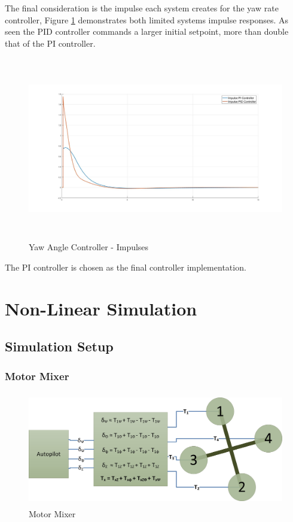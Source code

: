 	The final consideration is the impulse each system creates for the yaw rate controller, Figure \ref{IM_YawAngleImpulse} demonstrates both limited systems impulse responses. As seen the PID controller commands a larger initial setpoint, more than double that of the PI controller.    
	
	\begin{figure}[H]
		\centering
		\includegraphics[height = 8cm]{../Design/Matlab/Controllers/yaw_angle_impulse.jpg}
		\caption{Yaw Angle Controller -  Impulses}
		\label{IM_YawAngleImpulse}
	\end{figure}
	
	The PI controller is chosen as the final controller implementation. 
	
	\section{Non-Linear Simulation}\label{SECT_Nonlinear}
	\subsection{Simulation Setup}
	\subsubsection{Motor Mixer}		
	\begin{figure}[H]
		\centering
		\includegraphics[height = 5cm]{../References/Diagrams/MotorMixer.jpg}
		\caption{Motor Mixer}
		\label{IM_MotorMixer}
	\end{figure}	
